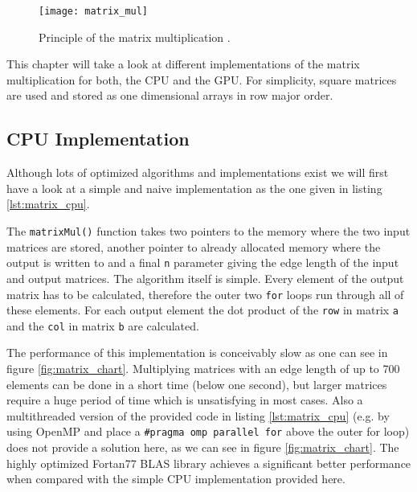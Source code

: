 \begin{figure}
\centering
\texttt{[image: matrix\_mul]}
\caption{Principle of the matrix multiplication \cite{wiki_matrix_mul}.}
\label{fig:matrix_mul}
\end{figure}

This chapter will take a look at different implementations of the matrix multiplication for both, the CPU and the GPU. For simplicity, square matrices are used and stored as one dimensional arrays in row major order.

\subsection{CPU Implementation}
\label{sec:matrix_cpu_implementation}

Although lots of optimized algorithms and implementations exist we will first have a look at a simple and naive implementation as the one given in listing \ref{lst:matrix_cpu}.



The \lstinline!matrixMul()! function takes two pointers to the memory where the two input matrices are stored, another pointer to already allocated memory where the output is written to and a final \lstinline!n! parameter giving the edge length of the input and output matrices.
The algorithm itself is simple. Every element of the output matrix has to be calculated, therefore the outer two \lstinline!for! loops run through all of these elements. For each output element the dot product of the \lstinline!row! in matrix \lstinline!a! and the \lstinline!col! in matrix \lstinline!b! are calculated.

The performance of this implementation is conceivably slow as one can see in figure \ref{fig:matrix_chart}. Multiplying matrices with an edge length of up to 700 elements can be done in a short time (below one second), but larger matrices require a huge period of time which is unsatisfying in most cases.
Also a multithreaded version of the provided code in listing \ref{lst:matrix_cpu} (e.g. by using OpenMP and place a \lstinline!#pragma omp parallel for! above the outer for loop) does not provide a solution here, as we can see in figure \ref{fig:matrix_chart}.
The highly optimized Fortan77 BLAS library \cite{blas_lib} achieves a significant better performance when compared with the simple CPU implementation provided here.

